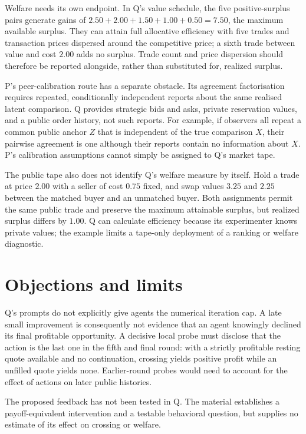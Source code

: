 \documentclass{article}
\begin{document}
Welfare needs its own endpoint. In Q's value schedule, the five positive-surplus pairs generate gains of \(2.50+2.00+1.50+1.00+0.50=7.50\), the maximum available surplus. They can attain full allocative efficiency with five trades and transaction prices dispersed around the competitive price; a sixth trade between value and cost \(2.00\) adds no surplus. Trade count and price dispersion should therefore be reported alongside, rather than substituted for, realized surplus. 

P's peer-calibration route has a separate obstacle. Its agreement factorisation requires repeated, conditionally independent reports about the same realised latent comparison. Q provides strategic bids and asks, private reservation values, and a public order history, not such reports. For example, if observers all repeat a common public anchor \(Z\) that is independent of the true comparison \(X\), their pairwise agreement is one although their reports contain no information about \(X\). P's calibration assumptions cannot simply be assigned to Q's market tape. 

The public tape also does not identify Q's welfare measure by itself. Hold a trade at price \(2.00\) with a seller of cost \(0.75\) fixed, and swap values \(3.25\) and \(2.25\) between the matched buyer and an unmatched buyer. Both assignments permit the same public trade and preserve the maximum attainable surplus, but realized surplus differs by \(1.00\). Q can calculate efficiency because its experimenter knows private values; the example limits a tape-only deployment of a ranking or welfare diagnostic. 

\section{Objections and limits}

Q's prompts do not explicitly give agents the numerical iteration cap. A late small improvement is consequently not evidence that an agent knowingly declined its final profitable opportunity. A decisive local probe must disclose that the action is the last one in the fifth and final round: with a strictly profitable resting quote available and no continuation, crossing yields positive profit while an unfilled quote yields none. Earlier-round probes would need to account for the effect of actions on later public histories. 

The proposed feedback has not been tested in Q. The material establishes a payoff-equivalent intervention and a testable behavioral question, but supplies no estimate of its effect on crossing or welfare. 
\end{document}
